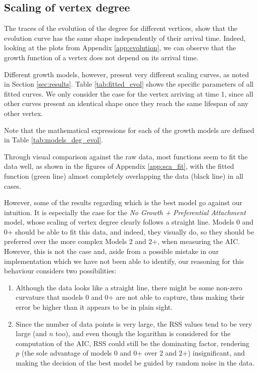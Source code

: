 \subsection{Scaling of vertex degree}

The traces of the evolution of the degree for different vertices, show that the evolution curve has the same shape independently of their arrival time. Indeed, looking at the plots from Appendix \ref{app:evolution}, we can observe that the growth function of a vertex does not depend on its arrival time.

Different growth models, however, present very different scaling curves, as noted in Section \ref{sec:results}. Table \ref{tab:fitted_evol} shows the specific parameters of all fitted curves. We only consider the case for the vertex arriving at time 1, since all other curves present an identical shape once they reach the same lifespan of any other vertex.



Note that the mathematical expressions for each of the growth models are defined in Table \ref{tab:models_deg_evol}.

Through visual comparison against the raw data, most functions seem to fit the data well, as shown in the figures of Appendix \ref{app:sca_fit}, with the fitted function (green line) almost completely overlapping the data (black line) in all cases.

However, some of the results regarding which is the best model go against our intuition. It is especially the case for the \textit{No Growth + Preferential Attachment} model, whose scaling of vertex degree clearly follows a straight line. Models 0 and 0+ should be able to fit this data, and indeed, they visually do, so they should be preferred over the more complex Models 2 and 2+, when measuring the AIC. However, this is not the case and, aside from a possible mistake in our implementation which we have not been able to identify, our reasoning for this behaviour considers two possibilities:
\begin{enumerate}
    \item Although the data looks like a straight line, there might be some non-zero curvature that models 0 and 0+ are not able to capture, thus making their error be higher than it appears to be in plain sight.
    \item Since the number of data points is very large, the RSS values tend to be very large (and $n$ too), and even though the logarithm is considered for the computation of the AIC, RSS could still be the dominating factor, rendering $p$ (the sole advantage of models 0 and 0+ over 2 and 2+) insignificant, and making the decision of the best model be guided by random noise in the data.
\end{enumerate}

